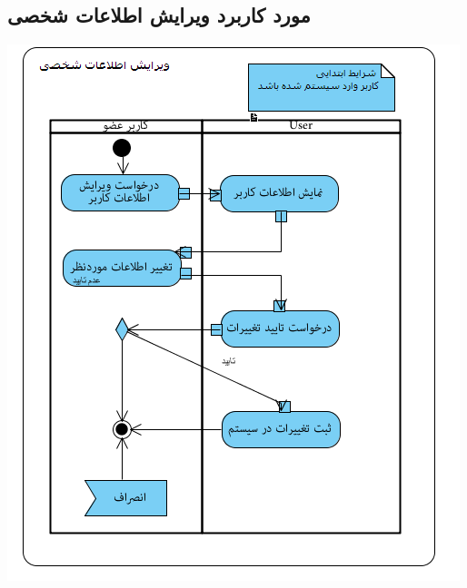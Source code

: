 \subsection*{مورد کاربرد ویرایش اطلاعات شخصی}
\vspace{2cm}
\begin{center}
\includegraphics[width=\textwidth]{ActivityDiagramsWithSwimlanes/11.png}
\end{center}

\newpage
\vspace{2cm}
